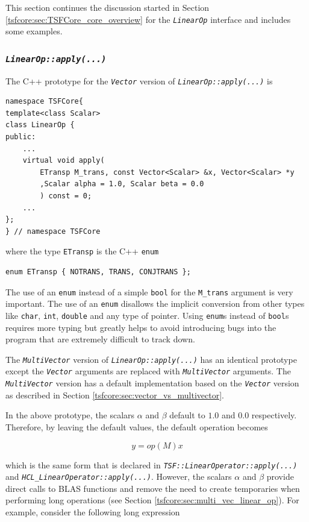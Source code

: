\documentclass[10pt,fleqn]{article}
\begin{document}
This section continues the discussion started in Section
\ref{tsfcore:sec:TSFCore_core_overview} for the
\texttt{\textit{LinearOp}} interface and includes some examples.

%
\subsubsection{\texttt{\textit{LinearOp::apply(...)}}}
\label{tsfcore:sec:linear_op_apply}
%

The C++ prototype for the \texttt{\textit{Vector}} version of
\texttt{\textit{LinearOp\-::apply(...)}} is

{\scriptsize\begin{verbatim}
namespace TSFCore{
template<class Scalar>
class LinearOp {
public:
    ...
    virtual void apply(
        ETransp M_trans, const Vector<Scalar> &x, Vector<Scalar> *y
        ,Scalar alpha = 1.0, Scalar beta = 0.0
        ) const = 0;
    ...
};
} // namespace TSFCore
\end{verbatim}}

where the type \texttt{ETransp} is the C++ \texttt{enum}

{\scriptsize\begin{verbatim}
enum ETransp { NOTRANS, TRANS, CONJTRANS };
\end{verbatim}}

The use of an \texttt{enum} instead of a simple \texttt{bool} for the
\texttt{M\_trans} argument is very important.  The use of an \texttt{enum}
disallows the implicit conversion from other types like \texttt{char},
\texttt{int}, \texttt{double} and any type of pointer.  Using \texttt{enum}s
instead of \texttt{bool}s requires more typing but greatly helps to
avoid introducing bugs into the program that are extremely difficult
to track down.

The \texttt{\textit{MultiVector}} version of
\texttt{\textit{LinearOp\-::apply(...)}} has an identical prototype
except the \texttt{\textit{Vector}} arguments are replaced with
\texttt{\textit{MultiVector}} arguments.  The \texttt{\textit{MultiVector}}
version has a default implementation based on the
\texttt{\textit{Vector}} version as described in Section
\ref{tsfcore:sec:vector_vs_multivector}.

In the above prototype, the scalars $\alpha$ and $\beta$ default to
$1.0$ and $0.0$ respectively.  Therefore, by leaving the default values,
the default operation becomes

\[
y = op(M) x
\]

which is the same form that is declared in
\texttt{\textit{TSF::LinearOperator::apply(...)}}  and
\texttt{\textit{HCL\_LinearOperator::apply(...)}}.  However, the scalars
$\alpha$ and $\beta$ provide direct calls to BLAS functions and remove
the need to create temporaries when performing long operations (see
Section \ref{tsfcore:sec:multi_vec_linear_op}).  For example, consider
the following long expression
\end{document}
